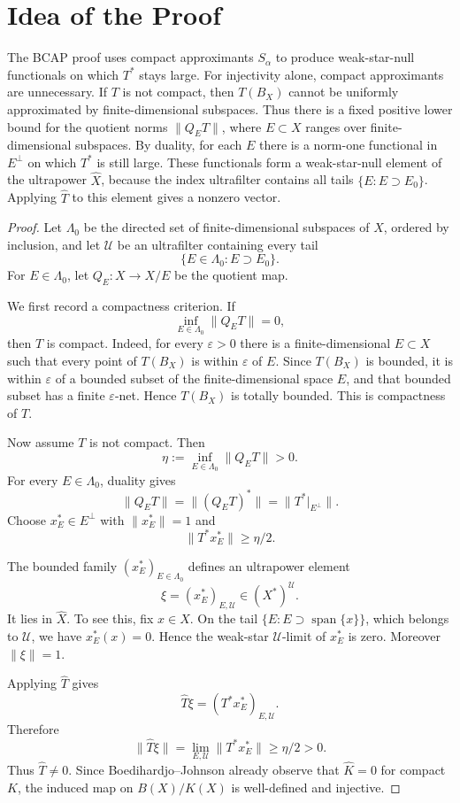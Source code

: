 \documentclass[11pt]{article}
\newcommand{\U}{\mathcal U}
\begin{document}
\section*{Idea of the Proof}

The BCAP proof uses compact approximants \(S_\alpha\) to produce weak-star-null
functionals on which \(T^*\) stays large.  For injectivity alone, compact
approximants are unnecessary.  If \(T\) is not compact, then \(T(B_X)\) cannot
be uniformly approximated by finite-dimensional subspaces.  Thus there is a
fixed positive lower bound for the quotient norms \(\|Q_E T\|\), where
\(E\subset X\) ranges over finite-dimensional subspaces.  By duality, for each
\(E\) there is a norm-one functional in \(E^\perp\) on which \(T^*\) is still
large.  These functionals form a weak-star-null element of the ultrapower
\(\widehat X\), because the index ultrafilter contains all tails
\(\{E:E\supset E_0\}\).  Applying \(\widehat T\) to this element gives a
nonzero vector.

\begin{proof}
Let \(\Lambda_0\) be the directed set of finite-dimensional subspaces of \(X\),
ordered by inclusion, and let \(\U\) be an ultrafilter containing every tail
\[
  \{E\in\Lambda_0:E\supset E_0\}.
\]
For \(E\in\Lambda_0\), let \(Q_E:X\to X/E\) be the quotient map.

We first record a compactness criterion.  If
\[
  \inf_{E\in\Lambda_0}\|Q_E T\|=0,
\]
then \(T\) is compact.  Indeed, for every \(\varepsilon>0\) there is a
finite-dimensional \(E\subset X\) such that every point of \(T(B_X)\) is within
\(\varepsilon\) of \(E\).  Since \(T(B_X)\) is bounded, it is within
\(\varepsilon\) of a bounded subset of the finite-dimensional space \(E\), and
that bounded subset has a finite \(\varepsilon\)-net.  Hence \(T(B_X)\) is
totally bounded.  This is compactness of \(T\).

Now assume \(T\) is not compact.  Then
\[
  \eta:=\inf_{E\in\Lambda_0}\|Q_E T\|>0.
\]
For every \(E\in\Lambda_0\), duality gives
\[
  \|Q_E T\|=\|(Q_E T)^*\|
  =\|T^*|_{E^\perp}\|.
\]
Choose \(x_E^*\in E^\perp\) with \(\|x_E^*\|=1\) and
\[
  \|T^*x_E^*\|\ge \eta/2.
\]

The bounded family \((x_E^*)_{E\in\Lambda_0}\) defines an ultrapower element
\[
  \xi=(x_E^*)_{E,\U}\in (X^*)^\U.
\]
It lies in \(\widehat X\).  To see this, fix \(x\in X\).  On the tail
\(\{E:E\supset \operatorname{span}\{x\}\}\), which belongs to \(\U\), we have
\(x_E^*(x)=0\).  Hence the weak-star \(\U\)-limit of \(x_E^*\) is zero.
Moreover \(\|\xi\|=1\).

Applying \(\widehat T\) gives
\[
  \widehat T\xi=(T^*x_E^*)_{E,\U}.
\]
Therefore
\[
  \|\widehat T\xi\|
  =\lim_{E,\U}\|T^*x_E^*\|
  \ge \eta/2>0.
\]
Thus \(\widehat T\ne 0\).  Since Boedihardjo--Johnson already observe that
\(\widehat K=0\) for compact \(K\), the induced map on \(B(X)/K(X)\) is
well-defined and injective.
\end{proof}
\end{document}
